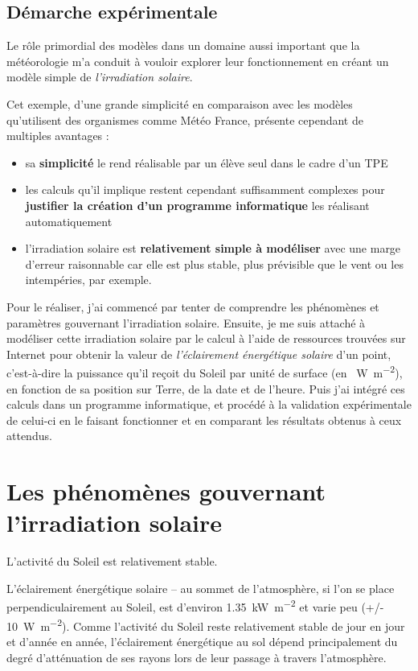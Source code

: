 \documentclass[12pt]{article}
\begin{document}
\subsection{Démarche expérimentale}

Le rôle primordial des modèles dans un domaine aussi important que la météorologie m'a conduit à vouloir explorer leur fonctionnement en créant un modèle simple de \emph{l'irradiation solaire}.

Cet exemple, d'une grande simplicité en comparaison avec les modèles qu'utilisent des organismes comme Météo France, présente cependant de multiples avantages :

\begin{itemize}
  \item sa \textbf{simplicité} le rend réalisable par un élève seul dans le cadre d'un TPE
  \item les calculs qu'il implique restent cependant suffisamment complexes pour \textbf{justifier la création d'un programme informatique} les réalisant automatiquement
  \item l'irradiation solaire est \textbf{relativement simple à modéliser} avec une marge d'erreur raisonnable car elle est plus stable, plus prévisible que le vent ou les intempéries, par exemple.
\end{itemize}

Pour le réaliser, j'ai commencé par tenter de comprendre les phénomènes et paramètres gouvernant l'irradiation solaire.
Ensuite, je me suis attaché à modéliser cette irradiation solaire par le calcul à l'aide de ressources trouvées sur Internet pour obtenir la valeur de \emph{l'éclairement énergétique solaire} d'un point, c'est-à-dire la puissance qu'il reçoit du Soleil par unité de surface (en \SI{}{\watt\per\square\meter}), en fonction de sa position sur Terre, de la date et de l'heure.
Puis j'ai intégré ces calculs dans un programme informatique, et procédé à la validation expérimentale de celui-ci en le faisant fonctionner et en comparant les résultats obtenus à ceux attendus.



\clearpage
\section{Les phénomènes gouvernant l'irradiation solaire}

L'activité du Soleil est relativement stable.

L'éclairement énergétique solaire -- au sommet de l'atmosphère, si l'on se place perpendiculairement au Soleil, est d'environ \SI{1.35}{\kilo\watt\per\square\meter} et varie peu (+/- \SI{10}{\watt\per\square\meter}).
Comme l'activité du Soleil reste relativement stable de jour en jour et d'année en année, l'éclairement énergétique au sol dépend principalement du degré d'atténuation de ses rayons lors de leur passage à travers l'atmosphère.
\end{document}
